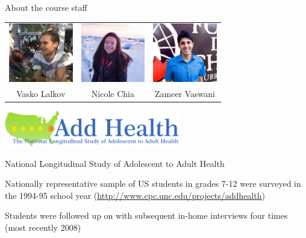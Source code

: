 \documentclass{beamer}\usepackage[]{graphicx}\usepackage[]{color}
\begin{document}
\begin{darkframes}
\begin{frame}{About the course staff}
\begin{itemize}
          \vspace{0.2in}
          \begin{center}
            \begin{tabular}{ccc}
              \includegraphics[width=1.1in]{vasko} &
              \includegraphics[width=1.1in]{nicole} &
              \includegraphics[width=1.1in]{zameer} \\
              Vasko Lalkov & Nicole Chia & Zameer Vaswani \\
            \end{tabular}
          \end{center}
      \end{itemize}
    \end{frame}

    \begin{frame}
      \begin{center}
        \includegraphics[width=3in]{add-health}

        \bigskip
        National Longitudinal Study of Adolescent to Adult Health

        \bigskip
        Nationally representative sample of US students in grades 7-12 were surveyed in the 1994-95 school year (\url{http://www.cpc.unc.edu/projects/addhealth})

        \bigskip
        Students were followed up on with subsequent in-home interviews four times (most recently 2008)
      \end{center}
    \end{frame}


\end{darkframes}
\end{document}
